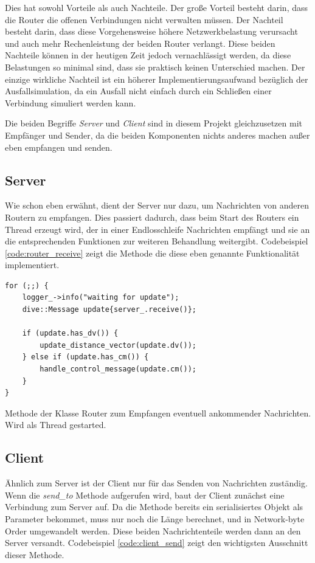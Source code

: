 \documentclass[a4paper,ngerman]{article}
\begin{document}
Dies hat sowohl Vorteile als auch Nachteile. Der große Vorteil besteht darin, dass die Router die offenen Verbindungen nicht verwalten müssen. Der Nachteil besteht darin, dass diese Vorgehensweise höhere Netzwerkbelastung verursacht und auch mehr Rechenleistung der beiden Router verlangt. Diese beiden Nachteile können in der heutigen Zeit jedoch vernachlässigt werden, da diese Belastungen so minimal sind, dass sie praktisch keinen Unterschied machen. Der einzige wirkliche Nachteil ist ein höherer Implementierungsaufwand bezüglich der Ausfallsimulation, da ein Ausfall nicht einfach durch ein Schließen einer Verbindung simuliert werden kann.

Die beiden Begriffe \textit{Server} und \textit{Client} sind in diesem Projekt gleichzusetzen mit Empfänger und Sender, da die beiden Komponenten nichts anderes machen außer eben empfangen und senden.

\subsection{Server}

Wie schon eben erwähnt, dient der Server nur dazu, um Nachrichten von anderen Routern zu empfangen. Dies passiert dadurch, dass beim Start des Routers ein Thread erzeugt wird, der in einer Endlosschleife Nachrichten empfängt und sie an die entsprechenden Funktionen zur weiteren Behandlung weitergibt. Codebeispiel \vref{code:router_receive} zeigt die Methode die diese eben genannte Funktionalität implementiert.

\begin{listing}
\begin{verbatim}
for (;;) {
    logger_->info("waiting for update");
    dive::Message update{server_.receive()};

    if (update.has_dv()) {
        update_distance_vector(update.dv());
    } else if (update.has_cm()) {
        handle_control_message(update.cm());
    }
}
\end{verbatim}

\caption{Methode der Klasse Router zum Empfangen eventuell ankommender Nachrichten. Wird als Thread gestarted.}
\label{code:router_receive}
\end{listing}

\FloatBarrier
\subsection{Client}

Ähnlich zum Server ist der Client nur für das Senden von Nachrichten zuständig. Wenn die \textit{send\_to} Methode aufgerufen wird, baut der Client zunächst eine Verbindung zum Server auf. Da die Methode bereits ein serialisiertes Objekt als Parameter bekommet, muss nur noch die Länge berechnet, und in Network-byte Order umgewandelt werden. Diese beiden Nachrichtenteile werden dann an den Server versandt. Codebeispiel \vref{code:client_send} zeigt den wichtigsten Ausschnitt dieser Methode.
\end{document}
